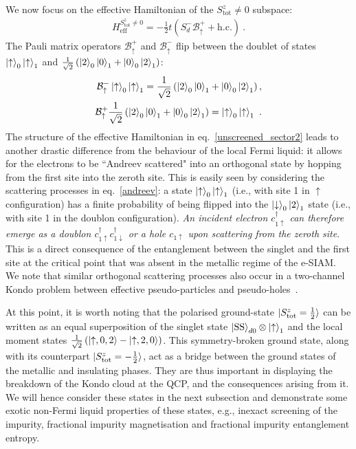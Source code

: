 \documentclass{iopart}
\begin{document}
We now focus on the effective Hamiltonian of the \(S^z_\text{tot} \neq 0\) subspace:
\begin{eqnarray}
	 H_\text{eff}^{S^z_\text{tot}\neq 0} = -\frac{1}{2}t\left(S_d^- \mathcal{B}^+_\uparrow + \text{h.c.}\right) \label{unscreened_sector2}~.
\end{eqnarray}
The Pauli matrix operators \(\mathcal{B}^+_\uparrow\) and \(\mathcal{B}^-_\uparrow\) flip between the doublet of states \(\ket{\uparrow}_0\ket{\uparrow}_1\) and \(\frac{1}{\sqrt 2}\left( \ket{2}_0\ket{0}_1 + \ket{0}_0\ket{2}_1 \right) \):
\begin{eqnarray}\label{andreev}
	\mathcal{B}^-_\uparrow\ket{\uparrow}_0\ket{\uparrow}_1 = \frac{1}{\sqrt 2}\left( \ket{2}_0\ket{0}_1 + \ket{0}_0\ket{2}_1 \right),\nonumber \\
	\mathcal{B}^+_\uparrow\frac{1}{\sqrt 2}\left( \ket{2}_0\ket{0}_1 + \ket{0}_0\ket{2}_1 \right) = \ket{\uparrow}_0\ket{\uparrow}_1~.
\end{eqnarray}
The structure of the effective Hamiltonian in eq.~\eqref{unscreened_sector2} leads to another drastic difference from the behaviour of the local Fermi liquid: it allows for the electrons to be ``Andreev scattered" into an orthogonal state by hopping from the first site into the zeroth site. This is easily seen by considering the scattering processes in eq.~\eqref{andreev}: a state \(\ket{\uparrow}_0\ket{\uparrow}_1\) (i.e., with site 1 in $\uparrow$ configuration) has a finite probability of being flipped into the \(\ket{\downarrow}_0\ket{2}_1\) state (i.e., with site 1 in the doublon configuration). {\it An incident electron \(c^\dagger_{1 \uparrow}\) can therefore emerge as a doublon \(c^\dagger_{1 \uparrow}c^\dagger_{1 \downarrow}\) or a hole \(c_{1 \uparrow}\) upon scattering from the zeroth site}. This is a direct consequence of the entanglement between the singlet and the first site at the critical point that was absent in the metallic regime of the e-SIAM. We note that similar orthogonal scattering processes also occur in a two-channel Kondo problem between effective pseudo-particles and pseudo-holes~\cite{von_delft_1998}.

At this point, it is worth noting that the polarised ground-state \(\ket{S_\text{tot}^z=\frac{1}{2}}\) can be written as an equal superposition of the singlet state \(\ket{\text{SS}}_{d0}\otimes\ket{\uparrow}_1\) and the local moment states \(\frac{1}{\sqrt 2}\left(\ket{\uparrow, 0, 2} - \ket{\uparrow, 2, 0}\right)\). This symmetry-broken ground state, along with its counterpart $\ket{S_\text{tot}^z=-\frac{1}{2}}$, act as a bridge between the ground states of the metallic and insulating phases. They are thus important in displaying the breakdown of the Kondo cloud at the QCP, and the consequences arising from it. We will hence consider these states in the next subsection and demonstrate some exotic non-Fermi liquid properties of these states, e.g., inexact screening of the impurity, fractional impurity magnetisation and fractional impurity entanglement entropy.
\end{document}

